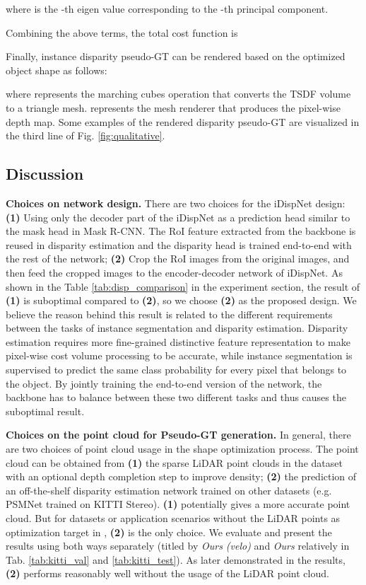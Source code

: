\documentclass[10pt,twocolumn,letterpaper]{article}
\begin{document}
where  is the -th eigen value corresponding to the -th principal component.

Combining the above terms, the total cost function is


Finally, instance disparity pseudo-GT  can be rendered based on the optimized object shape as follows:

where  represents the marching cubes \cite{lorensen1987marching} operation that converts the TSDF volume to a triangle mesh.
 represents the mesh renderer that produces the pixel-wise depth map.
Some examples of the rendered disparity pseudo-GT are visualized in the third line of Fig. \ref{fig:qualitative}.






\subsection{Discussion}
\noindent\textbf{Choices on network design.}
There are two choices for the iDispNet design:
\textbf{(1)} Using only the decoder part of the iDispNet as a prediction head similar to the mask head in Mask R-CNN. 
The RoI feature extracted from the backbone is reused in disparity estimation and the disparity head is trained end-to-end with the rest of the network;
\textbf{(2)} Crop the RoI images from the original images, and then feed the cropped images to the encoder-decoder network of iDispNet.
As shown in the Table \ref{tab:disp_comparison} in the experiment section,
the result of \textbf{(1)} is suboptimal compared to \textbf{(2)}, 
so we choose \textbf{(2)} as the proposed design.
We believe the reason behind this result is related to the different requirements between the tasks of instance segmentation and disparity estimation.
Disparity estimation requires more fine-grained distinctive feature representation to make pixel-wise cost volume processing to be accurate, 
while instance segmentation is supervised to predict the same class probability for every pixel that belongs to the object.
By jointly training the end-to-end version of the network, the backbone has to balance between these two different tasks and thus causes the suboptimal result.

\medskip\noindent\textbf{Choices on the point cloud for Pseudo-GT generation.}
In general, there are two choices of point cloud usage in the shape optimization process.
The point cloud can be obtained from 
\textbf{(1)} the sparse LiDAR point clouds in the dataset with an optional depth completion step to improve density;
\textbf{(2)} the prediction of an off-the-shelf disparity estimation network trained on other datasets (e.g. PSMNet trained on KITTI Stereo).
\textbf{(1)} potentially gives a more accurate point cloud.
But for datasets or application scenarios without the LiDAR points as optimization target in , \textbf{(2)} is the only choice.
We evaluate and present the results using both ways separately (titled by \textit{Ours (velo)} and \textit{Ours} relatively in Tab. \ref{tab:kitti_val} and \ref{tab:kitti_test}).
As later demonstrated in the results, \textbf{(2)} performs reasonably well without the usage of the LiDAR point cloud.
\end{document}
